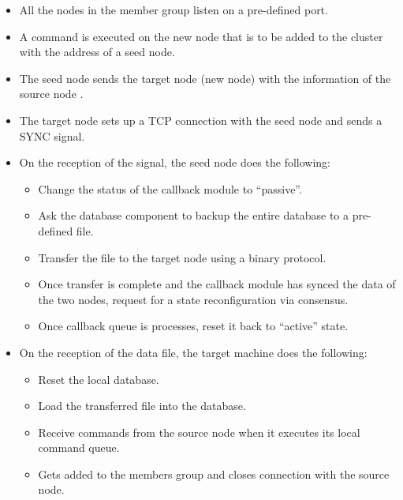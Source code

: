 \begin{itemize}
  \item All the nodes in the member group listen on a pre-defined port.
  \item A command is executed on the new node that is to be added to the cluster
    with the address of a seed%
     node.
  \item The seed node sends the target node (new node) with the information of
    the source node%
    .
  \item The target node sets up a TCP connection with the seed node and sends
    a SYNC%
     signal.
  \item On the reception of the signal, the seed node does the following:
    \begin{itemize}
      \item Change the status of the callback module to ``passive''.
      \item Ask the database component to backup the entire database to a
        pre-defined file.
      \item Transfer the file to the target node using a binary protocol.
      \item Once transfer is complete and the callback module has synced
        the data of the two nodes, request for a state reconfiguration via
        consensus.
      \item Once callback queue is processes, reset it back to ``active'' state.
    \end{itemize}
  \item On the reception of the data file, the target machine does the
    following:
    \begin{itemize}
      \item Reset the local database.
      \item Load the transferred file into the database.
      \item Receive commands from the source node when it executes its local
        command queue.
      \item Gets added to the members group and closes connection with the
        source node.
    \end{itemize}
\end{itemize}

